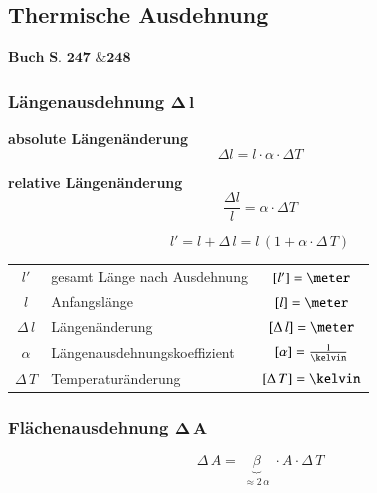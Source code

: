 \subsection{Thermische Ausdehnung}
\begin{flushright}
	$\boxed{\textbf{Buch S. 247 \& 248}}$
\end{flushright}

\subsubsection{Längenausdehnung $\bm{\Delta \, l}$}

\hspace*{\fill}
\begin{minipage}[t]{0.4\columnwidth}
	\textbf{absolute Längenänderung} \\
	{\centering 
	$$\boxed{\Delta l = l \cdot \alpha \cdot \Delta T}$$}
\end{minipage}
\hfill
\begin{minipage}[t]{0.5\columnwidth}
	\textbf{relative Längenänderung} \\
	{\centering 
	$$\boxed{\frac{\Delta l}{l} = \alpha \cdot \Delta T}$$}
\end{minipage}
\hspace*{\fill}

\medskip

$$\boxed{ l' = l + \Delta \, l = l \, (1 + \alpha \cdot \Delta \, T )}$$


\begin{tabular}{c l c}
	     $l'$      & gesamt Länge nach Ausdehnung & $[l'] = \meter$                \\
	     $l$       & Anfangslänge                 & $[l] = \meter$                 \\
	$\Delta \, l$  & Längenänderung               & $[\Delta \, l] = \meter$       \\
	   $\alpha$    & Längenausdehnungskoeffizient & $[\alpha] = \frac{1}{\kelvin}$ \\
	$\Delta \, T $ & Temperaturänderung           & $[\Delta \, T ] = \kelvin$
\end{tabular}


\subsubsection{Flächenausdehnung $\bm{\Delta \, A}$}

$$\boxed{\Delta \,  A = \underbrace{  \beta }_{\substack{\approx 2 \, \alpha}}  \cdot A \cdot \Delta \, T}$$

